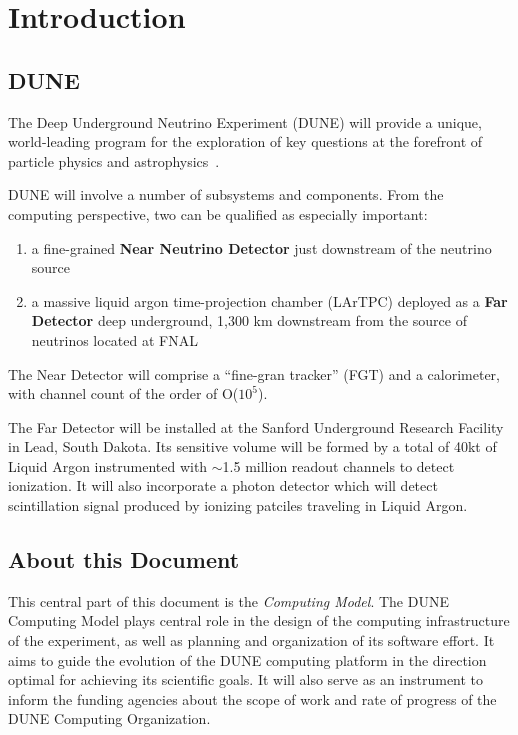 \section{Introduction}
\subsection{DUNE}

The Deep Underground Neutrino Experiment (DUNE) will provide a unique, world-leading program
for the exploration of key questions at the forefront of particle physics and astrophysics~\cite{sciopps}.

DUNE will involve a number of subsystems and components. From the computing
perspective, two can be qualified as especially important:

\begin{enumerate}

\item a fine-grained \textbf{Near Neutrino Detector} just downstream of the neutrino source
\item a massive liquid argon time-projection chamber (LArTPC) deployed as a \textbf{Far
Detector} deep underground, 1,300 km downstream from the source of neutrinos located at FNAL

\end{enumerate}

The Near Detector will comprise a ``fine-gran tracker'' (FGT) and a calorimeter, with channel count of the order of O($10^{5}$).

The Far Detector will be installed at the Sanford Underground Research Facility in Lead, South Dakota.
Its sensitive volume will be formed by a total of 40kt of Liquid Argon instrumented with $\sim$1.5 million readout
channels to detect ionization. It will also incorporate a photon detector which will detect scintillation
signal produced by ionizing patciles traveling in Liquid Argon.



\subsection{About this Document}
\label{sec:modelrole}

This central part of this document is the \textit{Computing Model}. The DUNE Computing Model plays central role in the design of the computing infrastructure
of the experiment, as well as planning and organization of its software effort. It aims to guide the evolution of the DUNE computing platform in the direction
optimal for achieving its scientific goals. It will also serve as an instrument to inform the funding agencies about the scope of work and rate of progress of the DUNE  
Computing Organization.


